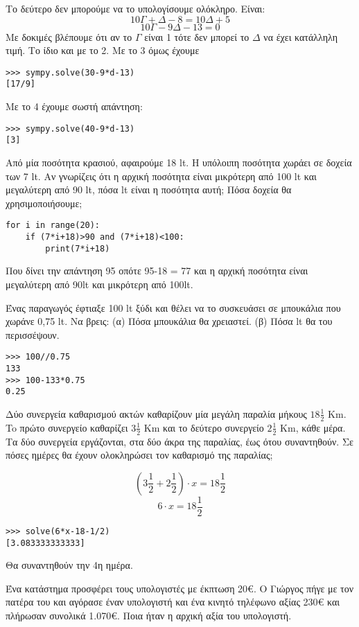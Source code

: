 Το δεύτερο δεν μπορούμε να το υπολογίσουμε ολόκληρο.
Είναι:
$$10\Gamma+\Delta-8 = 10\Delta + 5$$
$$10\Gamma-9\Delta-13=0$$
Με δοκιμές βλέπουμε ότι αν το $\Gamma$ είναι 1 τότε δεν μπορεί το $\Delta$ να έχει κατάλληλη τιμή. Το ίδιο και με το 2. Με το 3 όμως έχουμε 
\begin{lstlisting}
>>> sympy.solve(30-9*d-13)
[17/9]
\end{lstlisting}
Με το 4 έχουμε σωστή απάντηση:
\begin{lstlisting}
>>> sympy.solve(40-9*d-13)
[3]
\end{lstlisting}
\begin{exercise}
Από μία ποσότητα κρασιού, αφαιρούμε 18 lt. Η υπόλοιπη ποσότητα χωράει σε δοχεία
των 7 lt. Αν γνωρίζεις ότι η αρχική ποσότητα είναι μικρότερη από 100 lt και μεγαλύτερη
από 90 lt, πόσα lt είναι η ποσότητα αυτή; Πόσα δοχεία θα χρησιμοποιήσουμε;
\end{exercise}
\begin{lstlisting}
for i in range(20):
    if (7*i+18)>90 and (7*i+18)<100:
        print(7*i+18)
\end{lstlisting}
Που δίνει την απάντηση 95 οπότε 95-18 = 77 και η αρχική ποσότητα είναι μεγαλύτερη από 90lt και μικρότερη από 100lt.
\begin{exercise}
Ένας παραγωγός έφτιαξε 100 lt ξύδι και θέλει να το συσκευάσει σε μπουκάλια που χωράνε
0,75 lt. Να βρεις: (α) Πόσα μπουκάλια θα χρειαστεί. (β) Πόσα lt θα του περισσέψουν.
\end{exercise}
\begin{lstlisting}
>>> 100//0.75
133
>>> 100-133*0.75
0.25
\end{lstlisting}
\begin{exercise}
Δύο συνεργεία καθαρισμού ακτών καθαρίζουν μία μεγάλη παραλία μήκους $18\frac{1}{2}$ Κm.
To πρώτο συνεργείο καθαρίζει $3\frac{1}{2}$ Km και το δεύτερο συνεργείο $2\frac{1}{2}$ Km, κάθε μέρα.
Τα δύο συνεργεία εργάζονται, στα δύο άκρα της παραλίας, έως ότου συναντηθούν.
Σε πόσες ημέρες θα έχουν ολοκληρώσει τον καθαρισμό της παραλίας;
\end{exercise}
$$\left(3\frac{1}{2}+2\frac{1}{2}\right)\cdot x = 18\frac{1}{2}$$
$$6\cdot x = 18\frac{1}{2}$$
\begin{lstlisting}
>>> solve(6*x-18-1/2)
[3.083333333333]
\end{lstlisting}
Θα συναντηθούν την 4η ημέρα.
\begin{exercise}
Ένα κατάστημα προσφέρει τους υπολογιστές με έκπτωση 20€. Ο Γιώργος πήγε με
τον πατέρα του και αγόρασε έναν υπολογιστή και ένα κινητό τηλέφωνο αξίας 230€ και
πλήρωσαν συνολικά 1.070€. Ποια ήταν η αρχική αξία του υπολογιστή.
\end{exercise}
